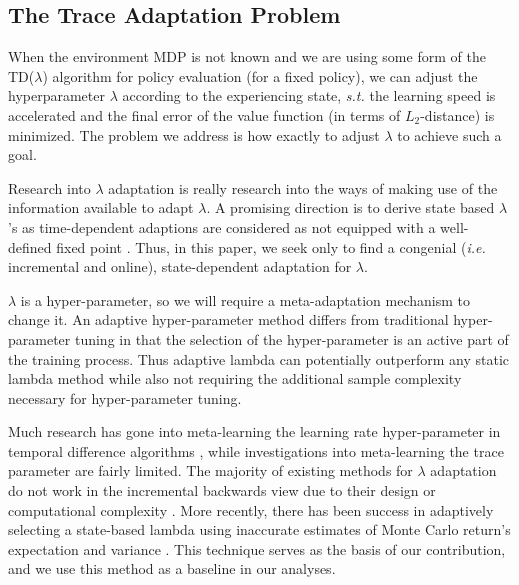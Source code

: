 \documentclass{article}
\newcommand\ie{\textit{i.e.}}
\newcommand\st{\textit{s.t.}}
\newcommand\doubleR{\mathbb{R}}
\newcommand\scriptS{\mathcal{S}}
\newcommand\scriptA{\mathcal{A}}
\begin{document}
\subsection{The Trace Adaptation Problem}
When the environment MDP is not known and we are using some form of the TD($\lambda$) algorithm for policy evaluation (for a fixed policy), we can adjust the hyperparameter $\lambda$ according to the experiencing state, \st{} the learning speed is accelerated and the final error of the value function (in terms of $L_2$-distance) is minimized. The problem we address is how exactly to adjust $\lambda$ to achieve such a goal.
\par
Research into $\lambda$ adaptation is really research into the ways of making use of the information available to adapt $\lambda$. A promising direction is to derive state based $\lambda$'s as time-dependent adaptions are considered as not equipped with a well-defined fixed point \cite{white2016greedy}. Thus, in this paper, we seek only to find a congenial (\ie{} incremental and online), state-dependent adaptation for $\lambda$.
\par
$\lambda$ is a hyper-parameter, so we will require a meta-adaptation mechanism to change it. An adaptive hyper-parameter method differs from traditional hyper-parameter tuning in that the selection of the hyper-parameter is an active part of the training process. Thus adaptive lambda can potentially outperform any static lambda method while also not requiring the additional sample complexity necessary for hyper-parameter tuning.
\par
Much research has gone into meta-learning the learning rate hyper-parameter in temporal difference algorithms \cite{dabney2012adaptive}, while investigations into meta-learning the trace parameter are fairly limited. The majority of existing methods for $\lambda$ adaptation do not work in the incremental backwards view due to their design or computational complexity \cite{kearns2000bias, schapire1996worst, singh1997analytical, konidaris2011td_gamma}. More recently, there has been success in adaptively selecting a state-based lambda using inaccurate estimates of Monte Carlo return's expectation and variance \cite{white2016greedy}. This technique serves as the basis of our contribution, and we use this method as a baseline in our analyses.

\end{document}
